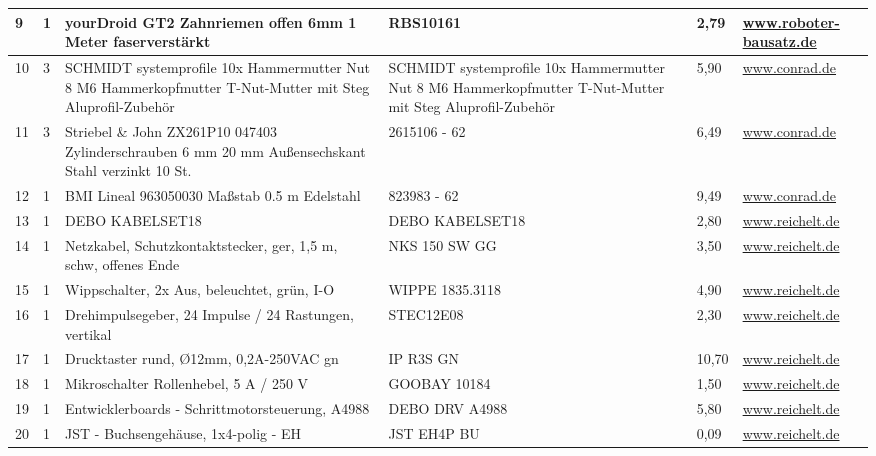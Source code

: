 \documentclass[12pt,a4paper]{scrbook}
\begin{document}
\begin{center}
\begin{tabularx}{\textwidth}{|p{0.4cm}|p{0.4cm}|X|X|p{1cm}|X|}
		\hline
		9 & 1 & yourDroid GT2 Zahnriemen offen 6mm 1 Meter faserverstärkt & RBS10161 & 2,79 & \href{https://www.roboter-bausatz.de}{www.roboter-bausatz.de} \\
		\hline
		10 & 3 & SCHMIDT systemprofile 10x Hammermutter Nut 8 M6 Hammerkopfmutter T-Nut-Mutter mit Steg Aluprofil-Zubehör & SCHMIDT systemprofile 10x Hammermutter Nut 8 M6 Hammerkopfmutter T-Nut-Mutter mit Steg Aluprofil-Zubehör & 5,90 & \href{https://www.conrad.de/}{www.conrad.de} \\
		\hline
		11 & 3 & Striebel \& John ZX261P10 047403 Zylinderschrauben 6 mm 20 mm Außensechskant Stahl verzinkt 10 St. & 2615106 - 62 & 6,49 &
		\href{https://www.conrad.de/}{www.conrad.de} \\
		\hline
		12 & 1 & BMI Lineal 963050030 Maßstab 0.5 m Edelstahl & 823983 - 62 & 9,49 & \href{https://www.conrad.de/}{www.conrad.de} \\
				\hline
		13 & 1 & DEBO KABELSET18 & DEBO KABELSET18 & 2,80 & \href{https://wwww.reichelt.de}{www.reichelt.de} \\
		\hline
		14 & 1 & Netzkabel, Schutzkontaktstecker, ger, 1,5 m, schw, offenes Ende & NKS 150 SW GG & 3,50 & \href{https://wwww.reichelt.de}{www.reichelt.de} \\
		\hline
		15 & 1 & Wippschalter, 2x Aus, beleuchtet, grün, I-O & WIPPE 1835.3118 & 4,90 & \href{https://wwww.reichelt.de}{www.reichelt.de} \\
		\hline
		16 & 1 & Drehimpulsegeber, 24 Impulse / 24 Rastungen, vertikal & STEC12E08 & 2,30 & \href{https://wwww.reichelt.de}{www.reichelt.de} \\
		\hline
		17 & 1 & Drucktaster rund, Ø12mm, 0,2A-250VAC gn & IP R3S GN & 10,70 & \href{https://wwww.reichelt.de}{www.reichelt.de} \\
		\hline
		18 & 1 & Mikroschalter Rollenhebel, 5 A / 250 V & GOOBAY 10184 & 1,50 & \href{https://wwww.reichelt.de}{www.reichelt.de} \\
		\hline
		19 & 1 & Entwicklerboards - Schrittmotorsteuerung, A4988 & DEBO DRV A4988 & 5,80 & \href{https://wwww.reichelt.de}{www.reichelt.de} \\
		\hline
		20 & 1 & JST - Buchsengehäuse, 1x4-polig - EH & JST EH4P BU & 0,09 & \href{https://wwww.reichelt.de}{www.reichelt.de} \\
		\hline
	\end{tabularx}
	
\end{center}
\end{document}
